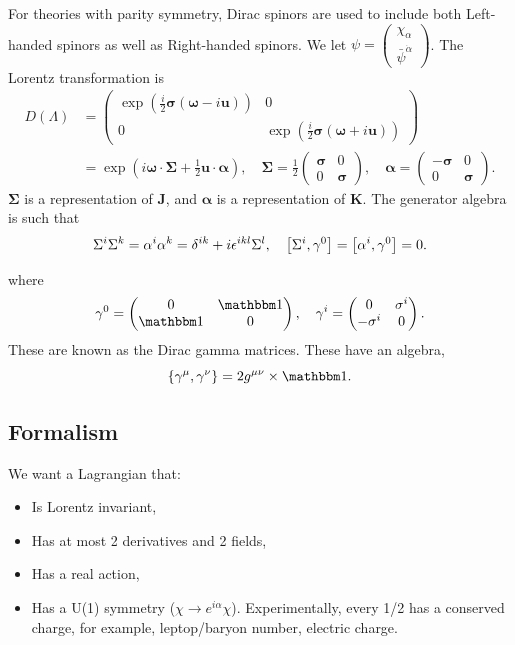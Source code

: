 \documentclass{article}
\begin{document}
For theories with parity symmetry, Dirac spinors are used to include both Left-handed spinors as well as Right-handed spinors. We let $\psi=\begin{pmatrix}\chi_\alpha\\\bar\psi^{\dot\alpha}\end{pmatrix}$. The Lorentz transformation is 
\begin{align*}
    D(\Lambda)&=\begin{pmatrix}\exp\left(\frac i2\boldsymbol\sigma(\boldsymbol\omega-i\mathbf u)\right)&0\\0&\exp\left(\frac i2\boldsymbol\sigma(\boldsymbol\omega+i\mathbf u)\right)\end{pmatrix}\\
    &=\exp\left(i\boldsymbol\omega\cdot\boldsymbol\Sigma+\frac 12\mathbf u\cdot\boldsymbol\alpha\right),\quad\boldsymbol\Sigma=\frac 12\begin{pmatrix}\boldsymbol\sigma&0\\0&\boldsymbol\sigma\end{pmatrix},\quad\boldsymbol\alpha=\begin{pmatrix}-\boldsymbol\sigma&0\\0&\boldsymbol\sigma\end{pmatrix}.
\end{align*}
$\boldsymbol\Sigma$ is a representation of $\mathbf J$, and $\boldsymbol\alpha$ is a representation of $\mathbf K$. The generator algebra is such that
$$\Sigma^i\Sigma^k=\alpha^i\alpha^k=\delta^{ik}+i\epsilon^{ikl}\Sigma^l,\quad\comm{\Sigma^i}{\gamma^0}=\comm{\alpha^i}{\gamma^0}=0.$$

where
$$\gamma^0=\begin{pmatrix}0&\mathbbm 1\\\mathbbm 1&0\end{pmatrix},\quad\gamma^i=\begin{pmatrix}0&\sigma^i\\-\sigma^i&0\end{pmatrix}.$$
These are known as the Dirac gamma matrices. These have an algebra,
$$\acomm{\gamma^\mu}{\gamma^\nu}=2g^{\mu\nu}\times\mathbbm 1.$$

\subsection{Formalism}
We want a Lagrangian that:
\begin{itemize}
    \item Is Lorentz invariant,
    \item Has at most 2 derivatives and 2 fields,
    \item Has a real action,
    \item Has a U(1) symmetry ($\chi\to e^{i\alpha}\chi$). Experimentally, every 1/2 has a conserved charge, for example, leptop/baryon number, electric charge.
\end{itemize}
\end{document}
